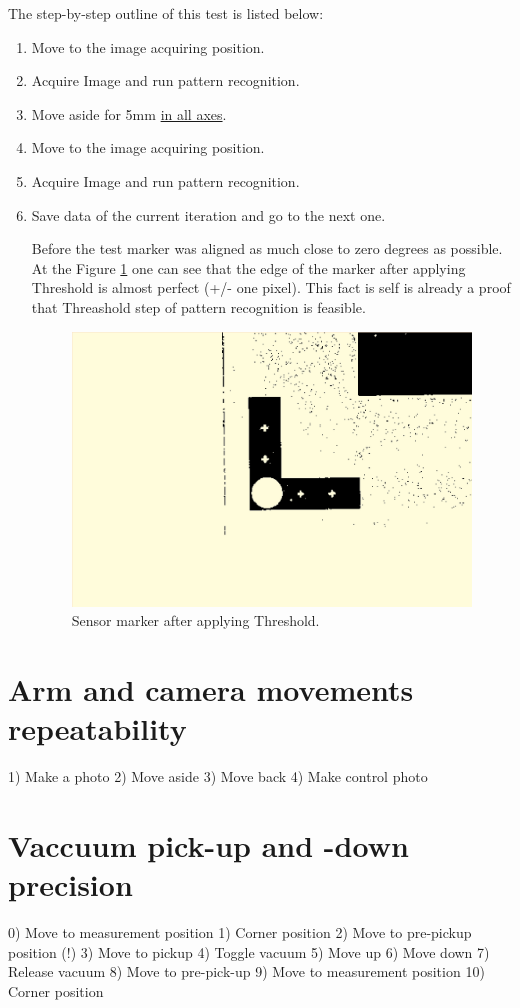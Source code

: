 The step-by-step outline of this test is listed below:\\
\begin{enumerate}
\item Move to the image acquiring position.
\item Acquire Image and run pattern recognition.
\item Move aside for 5mm \underline{in all axes}.
\item Move to the image acquiring position.
\item Acquire Image and run pattern recognition.
\item Save data of the current iteration and go to the next one.

Before the test marker was aligned as much close to zero degrees as possible. At the Figure \ref{fig:thresholded_marker} one can see that the edge of the marker after applying Threshold is almost perfect (+/- one pixel). This fact is self is already a proof that Threashold step of pattern recognition is feasible.

\begin{figure}[ht]\centering
\includegraphics[width=0.8\linewidth]{Data/Precision_tests/Thresholded_marker.png}
\caption{Sensor marker after applying Threshold.}
\label{fig:thresholded_marker}
\end{figure}

\end{enumerate}

\section{Arm and camera movements repeatability }

1) Make a photo
2) Move aside
3) Move back
4) Make control photo

\section{Vaccuum pick-up and -down precision}

0) Move to measurement position
1) Corner position
2) Move to pre-pickup position (!)
3) Move to pickup
4) Toggle vacuum 
5) Move up
6) Move down
7) Release vacuum
8) Move to pre-pick-up
9) Move to measurement position
10) Corner position

